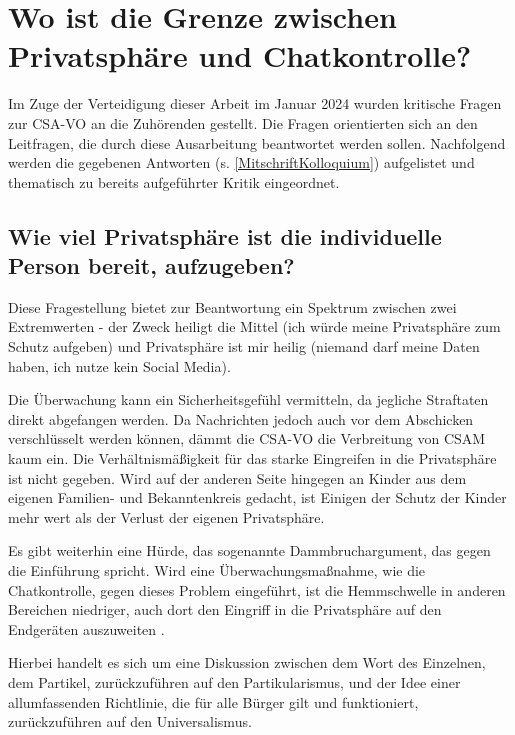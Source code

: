 \chapter{Wo ist die Grenze zwischen Privatsphäre und Chatkontrolle?} %
\label{ch:Diskussion}

Im Zuge der Verteidigung dieser Arbeit im Januar 2024 wurden kritische Fragen zur \ac{CSA-VO} an die Zuhörenden gestellt. Die Fragen orientierten sich an den Leitfragen, die durch diese Ausarbeitung beantwortet werden sollen. Nachfolgend werden die gegebenen Antworten (s. \autoref{MitschriftKolloquium}) aufgelistet und thematisch zu bereits aufgeführter Kritik eingeordnet.

\section*{Wie viel Privatsphäre ist die individuelle Person bereit, aufzugeben?}
\label{sec:Diskussion:ethischAkzeptabel}

Diese Fragestellung bietet zur Beantwortung ein Spektrum zwischen zwei Extremwerten - \glqq der Zweck heiligt die Mittel\grqq{} (ich würde meine Privatsphäre zum Schutz aufgeben) und \glqq Privatsphäre ist mir heilig\grqq{} (niemand darf meine Daten haben, ich nutze kein Social Media).

Die Überwachung kann ein Sicherheitsgefühl vermitteln, da jegliche Straftaten direkt abgefangen werden. Da Nachrichten jedoch auch vor dem Abschicken verschlüsselt werden können, dämmt die \ac{CSA-VO} die Verbreitung von \ac{CSAM} kaum ein. Die Verhältnismäßigkeit für das starke Eingreifen in die Privatsphäre ist nicht gegeben. Wird auf der anderen Seite hingegen an Kinder aus dem eigenen Familien- und Bekanntenkreis gedacht, ist Einigen der Schutz der Kinder mehr wert als der Verlust der eigenen Privatsphäre.

Es gibt weiterhin eine Hürde, das sogenannte Dammbruchargument, das gegen die Einführung spricht. Wird eine Überwachungsmaßnahme, wie die Chatkontrolle, gegen dieses Problem eingeführt, ist die Hemmschwelle in anderen Bereichen niedriger, auch dort den Eingriff in die Privatsphäre auf den Endgeräten auszuweiten \cite{edri:2023, np:meineck:2022}.

Hierbei handelt es sich um eine Diskussion zwischen dem Wort des Einzelnen, dem Partikel, zurückzuführen auf den Partikularismus, und der Idee einer allumfassenden Richtlinie, die für alle Bürger gilt und funktioniert, zurückzuführen auf den Universalismus.

